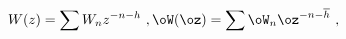 \begin{equation}
W(z)=\sum W_nz^{-n-h} \ , 
\oW(\oz)=\sum \oW_n\oz^{-n-\overline{h}} \ ,
\end{equation}

